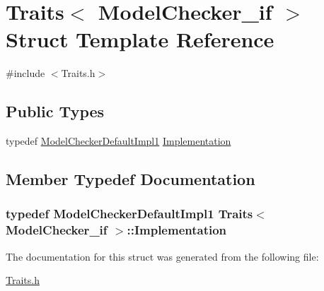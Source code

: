 \hypertarget{struct_traits_3_01_model_checker__if_01_4}{}\section{Traits$<$ Model\+Checker\+\_\+if $>$ Struct Template Reference}
\label{struct_traits_3_01_model_checker__if_01_4}


{\ttfamily \#include $<$Traits.\+h$>$}

\subsection*{Public Types}
\begin{DoxyCompactItemize}
\item 
typedef \hyperlink{class_model_checker_default_impl1}{Model\+Checker\+Default\+Impl1} \hyperlink{struct_traits_3_01_model_checker__if_01_4_a649f2e80cd1fbcf9fdc92b2302f5a61a}{Implementation}
\end{DoxyCompactItemize}


\subsection{Member Typedef Documentation}
\subsubsection[{\texorpdfstring{Implementation}{Implementation}}]{\setlength{\rightskip}{0pt plus 5cm}typedef {\bf Model\+Checker\+Default\+Impl1} {\bf Traits}$<$ {\bf Model\+Checker\+\_\+if} $>$\+::{\bf Implementation}}\hypertarget{struct_traits_3_01_model_checker__if_01_4_a649f2e80cd1fbcf9fdc92b2302f5a61a}{}\label{struct_traits_3_01_model_checker__if_01_4_a649f2e80cd1fbcf9fdc92b2302f5a61a}


The documentation for this struct was generated from the following file\+:\begin{DoxyCompactItemize}
\item 
\hyperlink{_traits_8h}{Traits.\+h}\end{DoxyCompactItemize}
